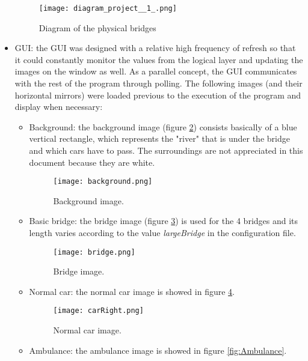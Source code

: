 \documentclass[a4paper,9pt]{article}
\begin{document}
\begin{itemize}
\begin{itemize}
\end{itemize}

\begin{figure}[H]
\centering
\texttt{[image: diagram\_project\_\_1\_.png]}
\caption{Diagram of the physical bridges }
\label{diagBridges}
 \end{figure} \bigskip


\item GUI: the GUI was designed with a relative high frequency of refresh so that it could constantly monitor the values from the logical layer and updating the images on the window as well. As a parallel concept, the GUI communicates with the rest of the program through polling. The following images (and their horizontal mirrors) were loaded previous to the execution of the program and display when necessary:
\begin{itemize}
\item Background: the background image (figure \ref{fig:background}) consists basically of a blue vertical rectangle, which represents the "river" that is under the bridge and which cars have to pass. The surroundings are not appreciated in this document because they are white.

\begin{figure}[H]
\centering
\texttt{[image: background.png]}
\caption{Background image.}
\label{fig:background}
 \end{figure} \bigskip

\item Basic bridge: the bridge image (figure \ref{fig:bridge}) is used for the 4 bridges and its length varies according to the value \emph{largeBridge} in the configuration file. 

\begin{figure}[H]
\centering
\texttt{[image: bridge.png]}
\caption{Bridge image.}
\label{fig:bridge}
 \end{figure} \bigskip

\item Normal car: the normal car image is showed in figure \ref{fig:Car}.

\begin{figure}[H]
\centering
\texttt{[image: carRight.png]}
\caption{Normal car image.}
\label{fig:Car}
 \end{figure} \bigskip


\item Ambulance: the ambulance image is showed in figure \ref{fig:Ambulance}.


\end{itemize}
\end{itemize}
\end{document}
